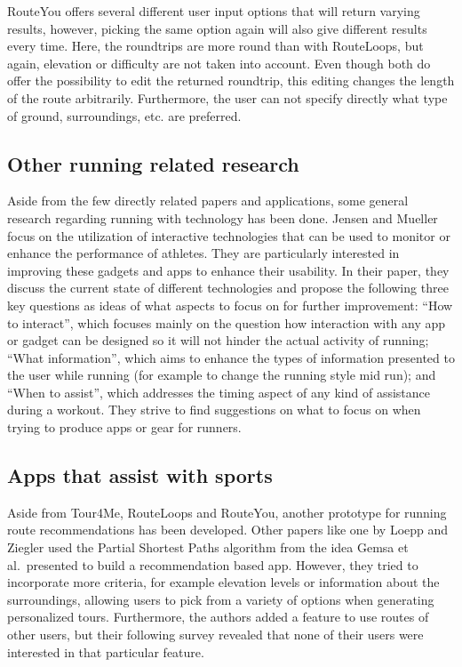 RouteYou offers several different user input options that will return varying results, however, picking the same option again will also give different results every time.   
Here, the roundtrips are more round than with RouteLoops, but again, elevation or difficulty are not taken into account. 
Even though both do offer the possibility to edit the returned roundtrip, this editing changes the length of the route arbitrarily.
Furthermore, the user can not specify directly what type of ground, surroundings, etc. are preferred. 




\subsection{Other running related research}
\label{subsec:otherRunningResearch}

Aside from the few directly related papers and applications, some general research regarding running with technology has been done.
Jensen and Mueller \cite{jensen_running_2014} focus on the utilization of interactive technologies that can be used to monitor or enhance the performance of athletes.
They are particularly interested in improving these gadgets and apps to enhance their usability. 
In their paper, they discuss the current state of different technologies and propose the following three key questions as ideas of what aspects to focus on for further improvement:
\enquote{How to interact}, which focuses mainly on the question how interaction with any app or gadget can be designed so it will not hinder the actual activity of running;
\enquote{What information}, which aims to enhance the types of information presented to the user while running (for example to change the running style mid run);
and \enquote{When to assist}, which addresses the timing aspect of any kind of assistance during a workout. 
They strive to find suggestions on what to focus on when trying to produce apps or gear for runners.



\subsection{Apps that assist with sports}
\label{subsec:runningApps}

Aside from Tour4Me, RouteLoops and RouteYou, another prototype for running route recommendations has been developed.
Other papers like one by Loepp and Ziegler \cite{loepp_recommending_2018} used the Partial Shortest Paths algorithm from the idea Gemsa et al.\ presented \cite{gemsa_efficient_2013} to build a recommendation based app.
However, they tried to incorporate more criteria, for example elevation levels or information about the surroundings, allowing users to pick from a variety of options when generating personalized tours. 
Furthermore, the authors added a feature to use routes of other users, but their following survey revealed that none of their users were interested in that particular feature.

